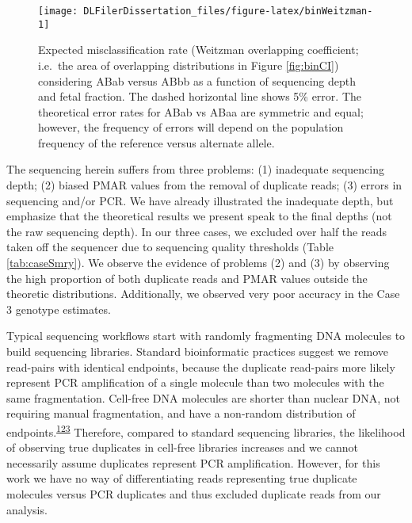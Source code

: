 \documentclass[11pt,letterpaper,oneside]{book}
\begin{document}
\begin{figure}

{\centering \texttt{[image: DLFilerDissertation\_files/figure-latex/binWeitzman-1]} 

}

\caption[Expected misclassification rate comparing maternal and fetal genotyping.]{Expected misclassification rate (Weitzman overlapping coefficient; i.e.~the area of overlapping distributions in Figure \ref{fig:binCI}) considering ABab versus ABbb as a function of sequencing depth and fetal fraction. The dashed horizontal line shows 5\% error. The theoretical error rates for ABab vs ABaa are symmetric and equal; however, the frequency of errors will depend on the population frequency of the reference versus alternate allele.}\label{fig:binWeitzman}
\end{figure}

The sequencing herein suffers from three problems: (1) inadequate sequencing depth; (2) biased PMAR values from the removal of duplicate reads; (3) errors in sequencing and/or PCR.
We have already illustrated the inadequate depth, but emphasize that the theoretical results we present speak to the final depths (not the raw sequencing depth).
In our three cases, we excluded over half the reads taken off the sequencer due to sequencing quality thresholds (Table \ref{tab:caseSmry}).
We observe the evidence of problems (2) and (3) by observing the high proportion of both duplicate reads and PMAR values outside the theoretic distributions.
Additionally, we observed very poor accuracy in the Case 3 genotype estimates.

Typical sequencing workflows start with randomly fragmenting DNA molecules to build sequencing libraries.
Standard bioinformatic practices suggest we remove read-pairs with identical endpoints, because the duplicate read-pairs more likely represent PCR amplification of a single molecule than two molecules with the same fragmentation.
Cell-free DNA molecules are shorter than nuclear DNA, not requiring manual fragmentation, and have a non-random distribution of endpoints.\textsuperscript{\protect\hyperlink{ref-chan:2016aa}{123}}
Therefore, compared to standard sequencing libraries, the likelihood of observing true duplicates in cell-free libraries increases and we cannot necessarily assume duplicates represent PCR amplification.
However, for this work we have no way of differentiating reads representing true duplicate molecules versus PCR duplicates and thus excluded duplicate reads from our analysis.
\end{document}

